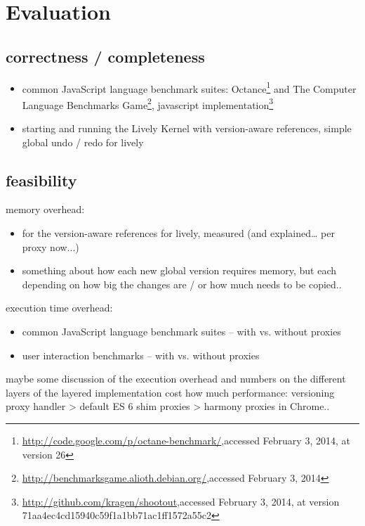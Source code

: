\section{Evaluation} \label{sec:EVALUATION}

\subsection{correctness / completeness}

\begin{itemize}
    \item common JavaScript language benchmark suites: Octance\footnote{\url{http://code.google.com/p/octane-benchmark/},\goodbreak accessed February 3, 2014, at version 26} and The Computer Language Benchmarks Game\footnote{\url{http://benchmarksgame.alioth.debian.org/},\goodbreak accessed February 3, 2014}, javascript implementation\footnote{\url{http://github.com/kragen/shootout},\goodbreak accessed February 3, 2014, at version 71aa4ec4cd15940c59f1a1bb71ac1ff1572a55c2}
    \item starting and running the Lively Kernel with version-aware references, simple global undo / redo for lively
\end{itemize}



\subsection{feasibility}

memory overhead:
\begin{itemize}
    \item for the version-aware references for lively, measured (and explained… per proxy now...)
    \item something about how each new global version requires memory, but each depending on how big the changes are / or how much needs to be copied..
\end{itemize}


execution time overhead:
\begin{itemize}
    \item common JavaScript language benchmark suites – with vs. without proxies
    \item user interaction benchmarks – with vs. without proxies
\end{itemize}

maybe some discussion of the execution overhead and numbers on the different layers of the layered implementation cost how much performance: versioning proxy handler > default ES 6 shim proxies > harmony proxies in Chrome..